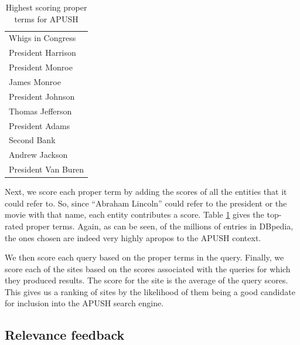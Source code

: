 \documentclass[pdfpagelabels=false,plainpages=true]{acm_proc_article-sp}
\begin{document}
\begin{table}
\begin{center}
\begin{tabular}{|l|} \hline
Whigs in Congress \\
President Harrison \\
President Monroe \\
James Monroe \\
President Johnson \\
Thomas Jefferson \\
President Adams \\
Second Bank \\
Andrew Jackson \\
President Van Buren \\
\hline\end{tabular}
\caption{Highest scoring proper terms for APUSH}
\label{tab-terms}
\end{center}
\end{table}

Next, we score each proper term by adding the scores of all the entities that it
could refer to. So, since ``Abraham Lincoln'' could refer to the president or the
movie with that name, each entity contributes a score. Table \ref{tab-terms}
gives the top-rated proper terms. Again, as can be seen, of the millions
of entries in DBpedia, the ones chosen are indeed very highly apropos to the
APUSH context.  

We then score each query based on the proper terms in the query. Finally, we
score each of the sites based on the scores associated with the queries for
which they produced results. The score for the site is the average of the query
scores. This gives us a ranking of sites by the likelihood of them being a good
candidate for inclusion into the APUSH search engine. 

\subsection{Relevance feedback}
\end{document}

